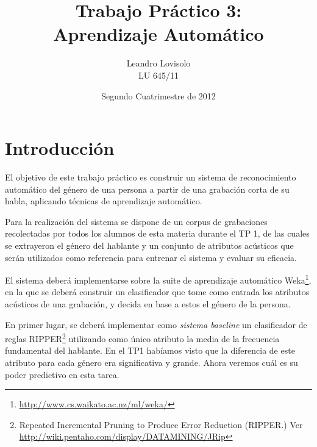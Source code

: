 \documentclass[10pt,a4paper]{article}
\title{Trabajo Práctico 3:\\Aprendizaje Automático}
\author{Leandro Lovisolo\\LU 645/11}
\date{Segundo Cuatrimestre de 2012}
\begin{document}
\maketitle
\thispagestyle{fancyplain}

\section{Introducción}

El objetivo de este trabajo práctico es construir un sistema de reconocimiento automático del género de una persona a partir de una grabación corta de su habla, aplicando técnicas de aprendizaje automático.

Para la realización del sistema se dispone de un corpus de grabaciones recolectadas por todos los alumnos de esta materia durante el TP 1, de las cuales se extrayeron el género del hablante y un conjunto de atributos acústicos que serán utilizados como referencia para entrenar el sistema y evaluar su eficacia.

El sistema deberá implementarse sobre la suite de aprendizaje automático Weka\footnote{\url{http://www.cs.waikato.ac.nz/ml/weka/}}, en la que se deberá construir un clasificador que tome como entrada los atributos acústicos de una grabación, y decida en base a estos el género de la persona.

En primer lugar, se deberá implementar como \textit{sistema baseline} un clasificador de reglas RIPPER\footnote{Repeated Incremental Pruning to Produce Error Reduction (RIPPER.) Ver \url{http://wiki.pentaho.com/display/DATAMINING/JRip}} utilizando como único atributo la media de la frecuencia fundamental del hablante. En el TP1 habíamos visto que la diferencia de este atributo para cada género era significativa y grande. Ahora veremos cuál es su poder predictivo en esta tarea.
\end{document}
